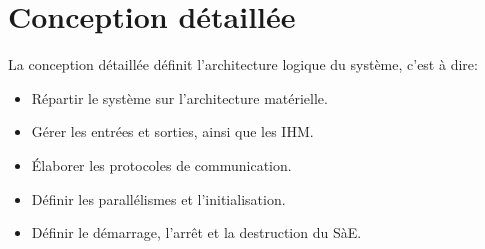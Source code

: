 \section{Conception détaillée}

La conception détaillée définit l'architecture logique du système, c'est à dire:
\begin{itemize}
    \item Répartir le système sur l'architecture matérielle.
    \item Gérer les entrées et sorties, ainsi que les IHM.
    \item Élaborer les protocoles de communication.
    \item Définir les parallélismes et l'initialisation.
    \item Définir le démarrage, l'arrêt et la destruction du SàE.
\end{itemize}







